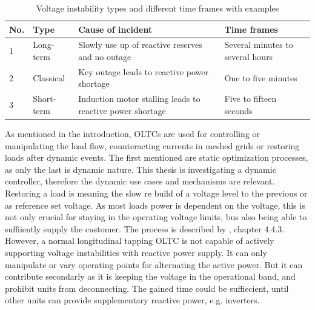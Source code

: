 \begin{table}[htbp!]
    \centering
    \caption[Voltage instability types and different time frames]{Voltage instability types and different time frames with examples \autocite{danish_2015}}
    \small
    \label{tab:voltage-instability-scenarios}
    \renewcommand\tabularxcolumn[1]{m{#1}}
    \vspace*{12pt}
    \begin{tabularx}{\textwidth}{llXX}
        \textbf{No.} & \textbf{Type} & \textbf{Cause of incident} & \textbf{Time frames} \\
        \toprule
        1 & Long-term & Slowly use up of reactive reserves and no outage & Several minutes to several hours \\
        2 & Classical & Key outage leads to reactive power shortage & One to five minutes \\
        3 & Short-term & Induction motor stalling leads to reactive power shortage & Five to fifteen seconds \\
        \bottomrule
    \end{tabularx}
\end{table}

As mentioned in the introduction, \acsp{OLTC} are used for controlling or manipulating the load flow, counteracting currents in meshed grids or restoring loads after dynamic events.
The first mentioned are static optimization processes, as only the last is dynamic nature.
This thesis is investigating a dynamic controller, therefore the dynamic use cases and mechanisms are relevant.
Restoring a load is meaning the slow re build of a voltage level to the previous or as reference set voltage.
As most loads power is dependent on the voltage, this is not only crucial for staying in the operating voltage limits, bus also being able to suffiiently supply the customer.
The process is described by \textcite{cutsem_1998}, chapter 4.4.3.
However, a normal longitudinal tapping \acs{OLTC} is not capable of actively supporting voltage instabilities with reactive power supply.
It can only manipulate or vary operating points for alternating the active power.
But it can contribute secondarly as it is keeping the voltage in the operational band, and prohibit units from deconnecting.
The gained time could be suffiecient, until other units can provide supplementary reactive power, e.g. inverters.       

